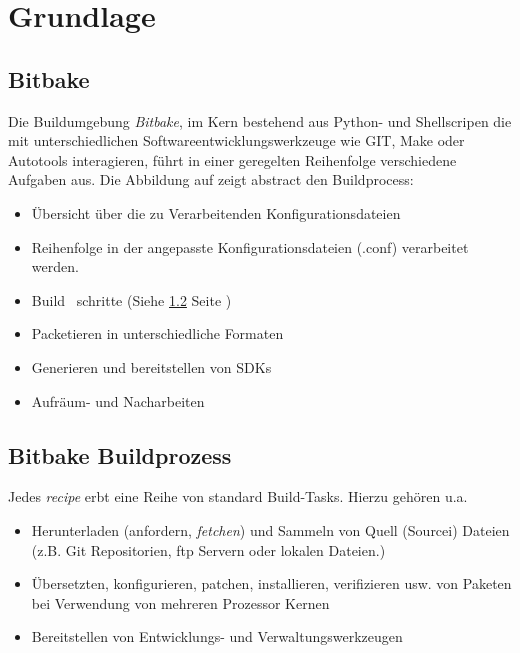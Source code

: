 

\chapter{Grundlage}%
\label{cha:grundlagen}

\section{Bitbake }%
\label{sec:bitbake_buildprozess}



Die Buildumgebung \textit{Bitbake}, im Kern bestehend aus Python- und
Shellscripen die mit unterschiedlichen Softwareentwicklungs\-werkzeuge wie GIT,
Make oder Autotools interagieren, führt in einer geregelten Reihenfolge verschiedene
Aufgaben aus. Die Abbildung auf \cite[S. 20]{Gonzalez2018:Embedded_Linux_Development_Using_Yocto_Project_Cookbook_2nd}
zeigt abstract den Build\-process:

\begin{itemize}
    \item Übersicht über die zu Verarbeitenden Konfigurationsdateien
    \item Reihenfolge in der angepasste Konfigurationsdateien (.conf)
        verarbeitet werden.
    \item Build ~schritte (Siehe \ref{sec:bitbake_build_tasks} Seite
        \pageref{sec:bitbake_build_tasks})
    \item Packetieren in unterschiedliche Formaten
    \item Generieren und bereitstellen von \aclp{SDK}
    \item Aufräum- und Nacharbeiten
\end{itemize}

\section{Bitbake Buildprozess}%
\label{sec:bitbake_build_tasks}

Jedes \textit{recipe} erbt eine Reihe von standard Build-Tasks. Hierzu
gehören u.a.
\begin{itemize}
    \item Herunterladen (anfordern, \textit{fetchen}) und Sammeln von Quell
        (Sourcei) Dateien (z.B. Git Repositorien, ftp Servern oder lokalen
        Dateien.) \item Übersetzten, konfigurieren, patchen, installieren,
        verifizieren usw.  von Paketen bei Verwendung von mehreren Prozessor
        Kernen \item Bereitstellen von Entwicklungs- und Verwaltungswerkzeugen
\end{itemize}

